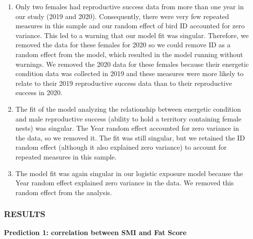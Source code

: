 \documentclass[
]{article}
\begin{document}
\begin{enumerate}
\def\labelenumi{\arabic{enumi})}
\setcounter{enumi}{5}
\item
  Only two females had reproductive success data from more than one year
  in our study (2019 and 2020). Consequently, there were very few
  repeated measures in this sample and our random effect of bird ID
  accounted for zero variance. This led to a warning that our model fit
  was singular. Therefore, we removed the data for these females for
  2020 so we could remove ID as a random effect from the model, which
  resulted in the model running without warnings. We removed the 2020
  data for these females because their energetic condition data was
  collected in 2019 and these measures were more likely to relate to
  their 2019 reproductive success data than to their reproductive
  success in 2020.
\item
  The fit of the model analyzing the relationship between energetic
  condition and male reproductive success (ability to hold a territory
  containing female nests) was singular. The Year random effect
  accounted for zero variance in the data, so we removed it. The fit was
  still singular, but we retained the ID random effect (although it also
  explained zero variance) to account for repeated measures in this
  sample.
\item
  The model fit was again singular in our logistic exposure model
  because the Year random effect explained zero variance in the data. We
  removed this random effect from the analysis.
\end{enumerate}

\pagebreak

\hypertarget{results}{%
\subsubsection{RESULTS}\label{results}}

\textbf{Prediction 1: correlation between SMI and Fat Score}
\end{document}

